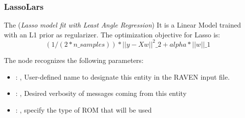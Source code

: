 \subsubsection{LassoLars}
  The  (\textit{Lasso model fit with Least Angle Regression})
  It is a Linear Model trained with an L1 prior as regularizer.                         The
  optimization objective for Lasso is:                         \begin{equation}
  (1 / (2 * n\_samples)) * ||y - Xw||^2\_2 + alpha * ||w||\_1                         \end{equation}

  The  node recognizes the following parameters:
    \begin{itemize}
      \item {}: ,
        User-defined name to designate this entity in the RAVEN input file.
      \item {}: ,
        Desired verbosity of messages coming from this entity
      \item {}: ,
        specify the type of ROM that will be used
  \end{itemize}

